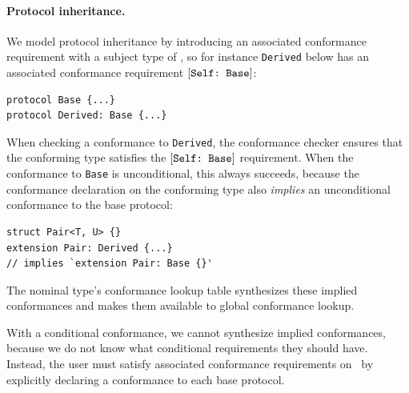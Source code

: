 \documentclass[../generics]{subfiles}
\begin{document}
\paragraph{Protocol inheritance.}
We model protocol inheritance by introducing an associated conformance requirement with a subject type of \tSelf, so for instance \texttt{Derived} below has an associated conformance requirement $[\texttt{Self:~Base}]$:
\begin{Verbatim}
protocol Base {...}
protocol Derived: Base {...}
\end{Verbatim}
When checking a conformance to \texttt{Derived}, the conformance checker ensures that the conforming type satisfies the $[\texttt{Self:~Base}]$ requirement. When the conformance to \texttt{Base} is unconditional, this always succeeds, because the conformance declaration on the conforming type also \emph{implies} an unconditional conformance to the base protocol:
\begin{Verbatim}
struct Pair<T, U> {}
extension Pair: Derived {...}
// implies `extension Pair: Base {}'
\end{Verbatim}
The nominal type's conformance lookup table synthesizes these implied conformances and makes them available to global conformance lookup.

With a conditional conformance, we cannot synthesize implied conformances, because we do not know what conditional requirements they should have. Instead, the user must satisfy associated conformance requirements on \tSelf\ by explicitly declaring a conformance to each base protocol.
\end{document}
